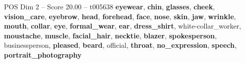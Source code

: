 \begin{textsample}{POS Dim 2 – Score 20.00 – t005638}  \label{ex:f2_pos_029}
\textbf{eyewear}, \textbf{chin}, \textbf{glasses}, \textbf{cheek}, \textbf{vision\_care}, \textbf{eyebrow}, \textbf{head}, \textbf{forehead}, \textbf{face}, \textbf{nose}, \textbf{skin}, \textbf{jaw}, \textbf{wrinkle}, \textbf{mouth}, \textbf{collar}, \textbf{eye}, \textbf{formal\_wear}, \textbf{ear}, \textbf{dress\_shirt}, white-collar\_worker, \textbf{moustache}, \textbf{muscle}, \textbf{facial\_hair}, \textbf{necktie}, \textbf{blazer}, \textbf{spokesperson}, businessperson, \textbf{pleased}, \textbf{beard}, official, \textbf{throat}, \textbf{no\_expression}, \textbf{speech}, \textbf{portrait\_photography}

\end{textsample}
